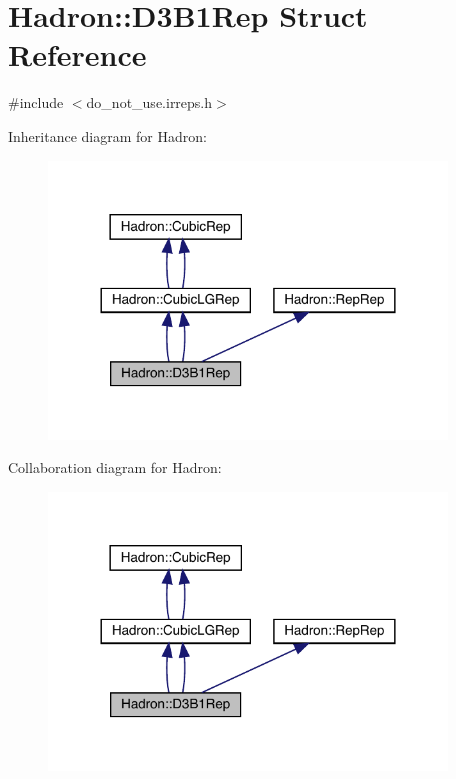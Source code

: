 \hypertarget{structHadron_1_1D3B1Rep}{}\section{Hadron\+:\+:D3\+B1\+Rep Struct Reference}
\label{structHadron_1_1D3B1Rep}


{\ttfamily \#include $<$do\+\_\+not\+\_\+use.\+irreps.\+h$>$}



Inheritance diagram for Hadron\+:\nopagebreak
\begin{figure}[H]
\begin{center}
\leavevmode
\includegraphics[width=300pt]{dd/d7b/structHadron_1_1D3B1Rep__inherit__graph}
\end{center}
\end{figure}


Collaboration diagram for Hadron\+:\nopagebreak
\begin{figure}[H]
\begin{center}
\leavevmode
\includegraphics[width=300pt]{df/df0/structHadron_1_1D3B1Rep__coll__graph}
\end{center}
\end{figure}
